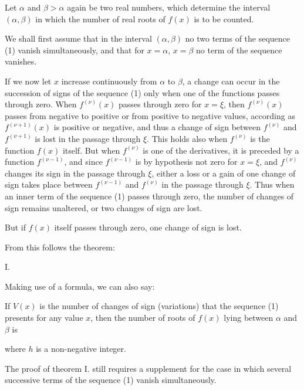
Let $\alpha$ and $\beta > \alpha$ again be two real numbers, which determine the interval $(\alpha, \beta)$ in which the number of real roots of $f(x)$ is to be counted.

We shall first assume that in the interval $(\alpha, \beta)$ no two terms of the sequence (1) vanish simultaneously, and that for $x = \alpha$, $x = \beta$ no term of the sequence vanishes.

If we now let $x$ increase continuously from $\alpha$ to $\beta$, a change can occur in the succession of signs of the sequence (1) only when one of the functions passes through zero. When $f^{(\nu)}(x)$ passes through zero for $x = \xi$, then $f^{(\nu)}(x)$ passes from negative to positive or from positive to negative values, according as $f^{(\nu+1)}(x)$ is positive or negative, and thus a change of sign between $f^{(\nu)}$ and $f^{(\nu+1)}$ is lost in the passage through $\xi$. This holds also when $f^{(\nu)}$ is the function $f(x)$ itself. But when $f^{(\nu)}$ is one of the derivatives, it is preceded by a function $f^{(\nu-1)}$, and since $f^{(\nu-1)}$ is by hypothesis not zero for $x = \xi$, and $f^{(\nu)}$ changes its sign in the passage through $\xi$, either a loss or a gain of one change of sign takes place between $f^{(\nu-1)}$ and $f^{(\nu)}$ in the passage through $\xi$. Thus when an inner term of the sequence (1) passes through zero, the number of changes of sign remains unaltered, or two changes of sign are lost.

But if $f(x)$ itself passes through zero, one change of sign is lost.

From this follows the theorem:

I. 

Making use of a formula, we can also say:

If $V(x)$ is the number of changes of sign (variations) that the sequence (1) presents for any value $x$, then the number of roots of $f(x)$ lying between $\alpha$ and $\beta$ is


where $h$ is a non-negative integer.

The proof of theorem I. still requires a supplement for the case in which several successive terms of the sequence (1) vanish simultaneously.
